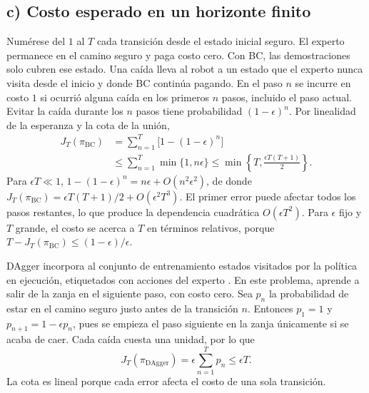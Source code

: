 \subsection*{c) Costo esperado en un horizonte finito}

Numérese del $1$ al $T$ cada transición desde el estado inicial seguro.
El experto permanece en el camino seguro y paga costo cero. Con BC,
las demostraciones solo cubren ese estado. Una caída lleva al robot a
un estado que el experto nunca visita desde el inicio y donde BC
continúa pagando. En el paso $n$ se incurre en costo $1$ si ocurrió
alguna caída en los primeros $n$ pasos, incluido el paso actual.
Evitar la caída durante los $n$ pasos tiene probabilidad $(1-\epsilon)^n$. Por
linealidad de la esperanza y la cota de la unión,
\begin{align*}
    J_T(\pi_{\mathrm{BC}})
      &= \sum_{n=1}^{T}\bigl[1-(1-\epsilon)^n\bigr] \\
      &\leq \sum_{n=1}^{T}\min\{1,n\epsilon\}
      \leq \min\left\{T,\frac{\epsilon T(T+1)}{2}\right\}.
\end{align*}
Para $\epsilon T\ll 1$,
$1-(1-\epsilon)^n=n\epsilon+O(n^2\epsilon^2)$, de donde
$J_T(\pi_{\mathrm{BC}})=\epsilon T(T+1)/2+O(\epsilon^2T^3)$.
El primer error puede afectar todos los pasos restantes, lo que
produce la dependencia cuadrática $O(\epsilon T^2)$. Para $\epsilon$
fijo y $T$ grande, el costo se acerca a $T$ en términos relativos,
porque $T-J_T(\pi_{\mathrm{BC}})\leq (1-\epsilon)/\epsilon$.

DAgger incorpora al conjunto de entrenamiento estados visitados por
la política en ejecución, etiquetados con acciones del experto
\cite[seccs.~2--4]{ross2011}. En este problema, aprende a salir de la
zanja en el siguiente paso, con costo cero. Sea $p_n$ la probabilidad
de estar en el camino seguro justo antes de la transición $n$.
Entonces $p_1=1$ y $p_{n+1}=1-\epsilon p_n$, pues se empieza el paso
siguiente en la zanja únicamente si se acaba de caer. Cada caída
cuesta una unidad, por lo que
\[
    J_T(\pi_{\mathrm{DAgger}})=\epsilon\sum_{n=1}^T p_n
         \leq \epsilon T.
\]
La cota es lineal porque cada error afecta el costo de una sola
transición.
